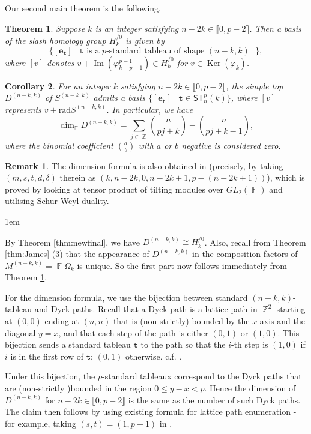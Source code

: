 \documentclass[a4paper]{amsart}
\makeatletter
\numberwithin{equation}{subsection}
\newtheorem{theorem}{Theorem}[section]
\newtheorem{corollary}[theorem]{Corollary}
\theoremstyle{definition}
\newtheorem{remark}{Remark}
\DeclareMathOperator{\F}{\mathbb{F}}
\DeclareMathOperator{\Z}{\mathbb{Z}}
\newcommand{\interval}[1]{\llbracket #1 \rrbracket}
\DeclareMathOperator{\Ker}{\mathrm{Ker}}
\DeclareMathOperator{\Image}{\mathrm{Im}}
\newcommand{\bfe}{\pmb{e}}
\newcommand{\tbx}{\mathtt{t}}
\newcommand{\ST}{\mathsf{ST}}
\renewenvironment{proof}[1][\proofname]{\par
	\pushQED{\qed}%
	\normalfont \topsep0\p@\@plus6\p@ \labelsep1em\relax
	\trivlist
	\item[\hskip\labelsep\bfseries #1]\ignorespaces
	\mbox{}%
}{
	\popQED\endtrivlist\@endpefalse
}
\numberwithin{equation}{subsection}
\makeatother
\begin{document}
Our second main theorem is the following.

\begin{theorem}\label{thm:basis}
Suppose $k$ is an integer satisfying $n-2k\in\interval{0,p-2}$.
Then a basis of the slash homology group $H_k^{/0}$ is given by \[
\{[\bfe_\tbx] \mid \tbx \text{ is a $p$-standard tableau of shape $(n-k,k)$ } \},
\]
where $[v]$ denotes $v+\Image(\varphi_{k-p+1}^{p-1}) \in H_k^{/0}$ for $v\in \Ker(\varphi_k)$.
\end{theorem}

\begin{corollary}
For an integer $k$ satisfying $n-2k\in\interval{0,p-2}$, the simple top $D^{(n-k,k)}$ of $S^{(n-k,k)}$ admits a basis $\{[\bfe_\tbx] \mid \tbx \in \ST_n^p(k) \}$, where $[v]$ represents $v+\mathrm{rad} S^{(n-k,k)}$.
In particular, we have
\[
\dim_{\F} D^{(n-k,k)} = \sum_{j\in \Z} \binom{n}{pj+k} - \binom{n}{pj+k-1},
\]
where the binomial coefficient $\binom{a}{b}$ with $a$ or $b$ negative is considered zero.
\end{corollary}
\begin{remark}
The dimension formula is also obtained in \cite{Erd} (precisely, \cite[Example 5.3]{Erd} by taking $(m, s, t, d, \delta)$ therein as $(k, n-2k, 0, n-2k+1, p-(n-2k+1))$), which is proved by looking at tensor product of tilting modules over $GL_2(\F)$ and utilising Schur-Weyl duality.
\end{remark}
\begin{proof}
By Theorem \ref{thm:newfinal}, we have $D^{(n-k,k)}\cong H_k^{\slash 0}$.
Also, recall from Theorem \ref{thm:James} (3) that the appearance of $D^{(n-k,k)}$ in the composition factors of $M^{(n-k,k)}=\F\Omega_k$ is unique.  So the first part now follows immediately from Theorem \ref{thm:basis}.

For the dimension formula, we use the bijection between standard $(n-k,k)$-tableau and Dyck paths.  Recall that a Dyck path is a lattice path in $\Z^2$ starting at $(0,0)$ ending at $(n,n)$ that is (non-strictly) bounded by the $x$-axis and the diagonal $y=x$, and that each step of the path is either $(0,1)$ or $(1,0)$.  This bijection sends a standard tableau $\tbx$ to the path so that the $i$-th step is $(1,0)$ if $i$ is in the first row of $\tbx$; $(0,1)$ otherwise. c.f. \cite[p.4-5]{Moh}.

Under this bijection, the $p$-standard tableaux correspond to the Dyck paths that are (non-strictly )bounded in the region $0 \leq y-x < p$. Hence the dimension of $D^{(n-k,k)}$ for $n-2k\in\interval{0,p-2}$ is the same as the number of such Dyck paths.  The claim then follows by using existing formula for lattice path enumeration - for example, taking $(s,t)=(1,p-1)$ in \cite[Theorem 2]{Moh}.
\end{proof}
\end{document}
